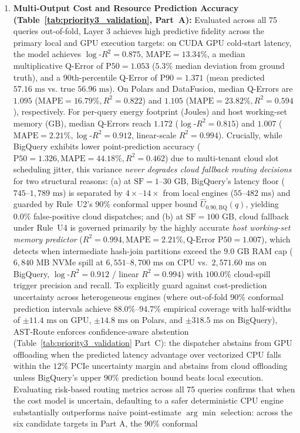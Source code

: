 \documentclass[10pt,a4paper]{article}
\begin{document}
\begin{enumerate}[leftmargin=1.5em,itemsep=0.8pt]
    \item \textbf{Multi-Output Cost and Resource Prediction Accuracy (Table~\ref{tab:priority3_validation}, Part~A):} Evaluated across all 75 queries out-of-fold, Layer 3 achieves high predictive fidelity across the primary local and GPU execution targets: on CUDA GPU cold-start latency, the model achieves $\log\text{-}R^2 = \mathbf{0.875}$, $\text{MAPE} = \mathbf{13.34\%}$, a median multiplicative Q-Error of $\text{P50} = \mathbf{1.053}$ ($5.3\%$ median deviation from ground truth), and a 90th-percentile Q-Error of $\text{P90} = \mathbf{1.371}$ (mean predicted $57.16\text{ ms}$ vs. true $56.96\text{ ms}$). On Polars and DataFusion, median Q-Errors are $\mathbf{1.095}$ ($\text{MAPE}=16.79\%, R^2=0.822$) and $\mathbf{1.105}$ ($\text{MAPE}=23.82\%, R^2=0.594$), respectively. For per-query energy footprint ($\text{Joules}$) and host working-set memory ($\text{GB}$), median Q-Errors reach $\mathbf{1.172}$ ($\log\text{-}R^2=0.815$) and $\mathbf{1.007}$ ($\text{MAPE}=2.21\%, \log\text{-}R^2=0.912$, linear-scale $R^2=0.994$). Crucially, while BigQuery exhibits lower point-prediction accuracy ($\text{P50}=1.326, \text{MAPE}=44.18\%, R^2=0.462$) due to multi-tenant cloud slot scheduling jitter, this variance \emph{never degrades cloud fallback routing decisions} for two structural reasons: (a) at $\text{SF}=1\text{--}30\text{ GB}$, BigQuery's latency floor ($745\text{--}1{,}789\text{ ms}$) is separated by $4\times\text{--}14\times$ from local engines ($55\text{--}482\text{ ms}$) and guarded by Rule~U2's $90\%$ conformal upper bound $\hat{U}_{0.90,\text{BQ}}(q)$, yielding $\mathbf{0.0\%}$ false-positive cloud dispatches; and (b) at $\text{SF}=100\text{ GB}$, cloud fallback under Rule~U4 is governed primarily by the highly accurate \emph{host working-set memory predictor} ($R^2 = \mathbf{0.994}, \text{MAPE} = \mathbf{2.21\%}, \text{Q-Error P50} = \mathbf{1.007}$), which detects when intermediate hash-join partitions exceed the $9.0\text{ GB}$ RAM cap ($6{,}840\text{ MB}$ NVMe spill at $6{,}551\text{--}8{,}700\text{ ms}$ on CPU vs.\ $2{,}571.60\text{ ms}$ on BigQuery, $\log\text{-}R^2=0.912$ / linear $R^2=0.994$) with $\mathbf{100.0\%}$ cloud-spill trigger precision and recall. To explicitly guard against cost-prediction uncertainty across heterogeneous engines (where out-of-fold 90\% conformal prediction intervals achieve $88.0\%\text{--}94.7\%$ empirical coverage with half-widths of $\pm 11.4\text{ ms}$ on GPU, $\pm 14.8\text{ ms}$ on Polars, and $\pm 318.5\text{ ms}$ on BigQuery), AST-Route enforces confidence-aware abstention (Table~\ref{tab:priority3_validation} Part~C): the dispatcher abstains from GPU offloading when the predicted latency advantage over vectorized CPU falls within the $12\%$ PCIe uncertainty margin and abstains from cloud offloading unless BigQuery's upper 90\% prediction bound beats local execution. Evaluating risk-based routing metrics across all 75 queries confirms that when the cost model is uncertain, defaulting to a safer deterministic CPU engine substantially outperforms naive point-estimate $\arg\min$ selection: across the six candidate targets in Part A, the 90\% conformal 
\end{enumerate}
\end{document}
